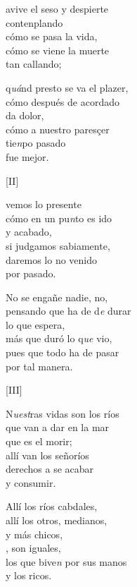\documentclass[11pt,a4paper,twoside]{article}
\begin{document}
avive el seso y despierte\\
contenplando\\
cómo se pasa la vida,\\
cómo se viene la muerte\\
tan callando;\par
q\emph{uá}nd presto se va el plazer,\\
cómo después de acordado\\
da dolor,\\
cómo a nuestro paresçer\\
 tie\emph{n}po pasado \\
fue mejor.\par
\pend

\begin{center}
		[II]
\end{center}
\pstart
{} vemos lo presente\\
cómo en un pu\emph{n}to  es ido\\
y acabado,\\
si judgamos sabiamente,\\
daremos lo no venido\\
por pasado.\par
No se engañe nadie, no,\\
pensando que ha de d\emph{e} durar\\ 
lo que espera,\\
más que duró lo q\emph{ue} vio,\\
pues que todo ha de pasar\\
por tal manera.\par
\pend

\begin{center}
		[III]
\end{center}
\pstart
N\emph{uest}ras vidas son los ríos\\
que van a dar en la mar\\
que es el morir;\\
allí van los señoríos\\
derechos a se acabar\\
y consumir.\par
Allí los ríos cabdales,\\
allí los otros, medianos,\\
y más chicos,\\
, son iguales,\\
los que bive\emph{n} por sus manos\\
y los ricos.\par
\pend
\end{document}
